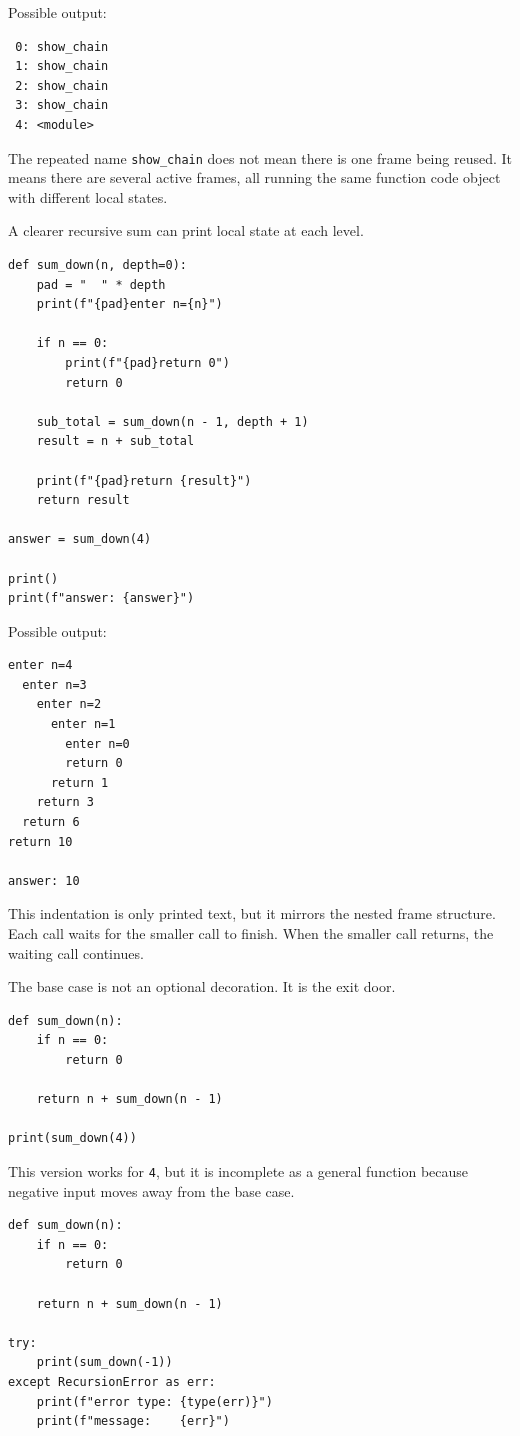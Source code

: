 Possible output:

\begin{verbatim}
 0: show_chain
 1: show_chain
 2: show_chain
 3: show_chain
 4: <module>
\end{verbatim}

The repeated name \texttt{show\_chain} does not mean there is one frame being reused. It means there are several active frames, all running the same function code object with different local states.

A clearer recursive sum can print local state at each level.

\begin{verbatim}
def sum_down(n, depth=0):
    pad = "  " * depth
    print(f"{pad}enter n={n}")

    if n == 0:
        print(f"{pad}return 0")
        return 0

    sub_total = sum_down(n - 1, depth + 1)
    result = n + sub_total

    print(f"{pad}return {result}")
    return result

answer = sum_down(4)

print()
print(f"answer: {answer}")
\end{verbatim}

Possible output:

\begin{verbatim}
enter n=4
  enter n=3
    enter n=2
      enter n=1
        enter n=0
        return 0
      return 1
    return 3
  return 6
return 10

answer: 10
\end{verbatim}

This indentation is only printed text, but it mirrors the nested frame structure. Each call waits for the smaller call to finish. When the smaller call returns, the waiting call continues.

The base case is not an optional decoration. It is the exit door.

\begin{verbatim}
def sum_down(n):
    if n == 0:
        return 0

    return n + sum_down(n - 1)

print(sum_down(4))
\end{verbatim}

This version works for \texttt{4}, but it is incomplete as a general function because negative input moves away from the base case.

\begin{verbatim}
def sum_down(n):
    if n == 0:
        return 0

    return n + sum_down(n - 1)

try:
    print(sum_down(-1))
except RecursionError as err:
    print(f"error type: {type(err)}")
    print(f"message:    {err}")
\end{verbatim}

